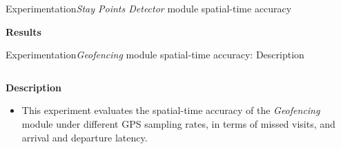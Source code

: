 \begin{frame}{Experimentation}{\emph{Stay Points Detector} module spatial-time accuracy}
\begin{block}{\small \textbf{Results}}
\end{block}
\end{frame}




\begin{frame}{Experimentation}{\emph{Geofencing} module spatial-time accuracy: Description}
\small 
\vspace{-0.4cm}
\begin{columns}
\begin{column}[T]{0.55\textwidth}

\begin{block}{\small \textbf{Description}}
\begin{itemize}
  \item This experiment evaluates the spatial-time accuracy of the \emph{Geofencing} module under different GPS sampling rates, in terms of missed visits, and arrival and departure latency.
\end{itemize}
\end{block}

\end{column}
\begin{column}[T]{0.45\textwidth}
\begin{table}
\centering
\renewcommand{\arraystretch}{0.8}
\caption{Input parameters for the spatial-time accuracy of Geofencing module experiment.}
\label{tab:exp-2-input-parameters}
\end{table}
\end{column}
\end{columns}



\end{frame}
